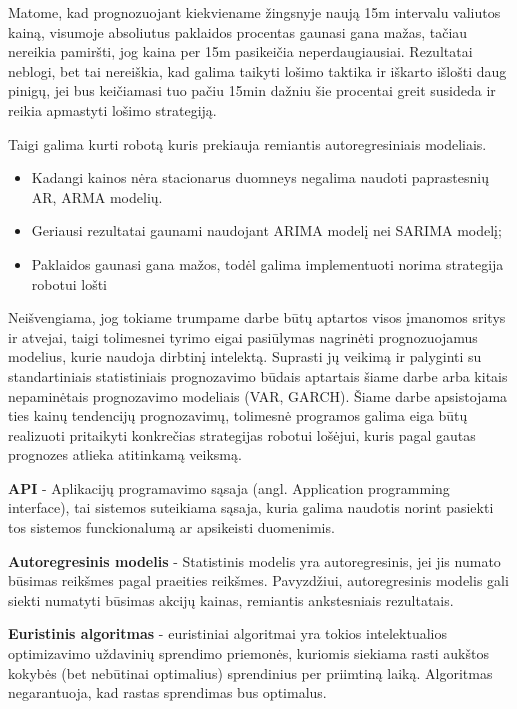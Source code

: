 \documentclass{VUMIFInfKursinis}
\begin{document}
Matome, kad prognozuojant kiekviename žingsnyje naują 15m intervalu valiutos kainą, visumoje absoliutus paklaidos procentas gaunasi gana mažas, tačiau
nereikia pamiršti, jog kaina per 15m pasikeičia neperdaugiausiai. Rezultatai neblogi, bet tai nereiškia, kad galima taikyti lošimo taktika ir iškarto išlošti daug pinigų,
jei bus keičiamasi tuo pačiu 15min dažniu šie procentai greit susideda ir reikia apmastyti lošimo strategiją.

\vspace{10pt}
Taigi galima kurti robotą kuris prekiauja remiantis autoregresiniais modeliais.
\begin{itemize}
  \item Kadangi kainos nėra stacionarus duomneys negalima naudoti paprastesnių AR, ARMA modelių.
  \item Geriausi rezultatai gaunami naudojant ARIMA modelį nei SARIMA modelį;
  \item Paklaidos gaunasi gana mažos, todėl galima implementuoti norima strategija robotui lošti
\end{itemize}
Neišvengiama, jog tokiame trumpame darbe būtų aptartos visos įmanomos sritys ir atvejai, taigi tolimesnei tyrimo eigai pasiūlymas nagrinėti prognozuojamus modelius, 
kurie naudoja dirbtinį intelektą. Suprasti jų veikimą ir palyginti su standartiniais statistiniais prognozavimo būdais aptartais šiame darbe arba kitais nepaminėtais
prognozavimo modeliais (VAR, GARCH). Šiame darbe apsistojama ties kainų tendencijų prognozavimų, tolimesnė programos galima eiga būtų realizuoti pritaikyti konkrečias strategijas 
robotui lošėjui, kuris pagal gautas prognozes atlieka atitinkamą veiksmą.

\textbf{API} - Aplikacijų programavimo sąsaja (angl. Application programming interface), tai sistemos suteikiama sąsaja, kuria galima naudotis norint pasiekti tos sistemos
funckionalumą ar apsikeisti duomenimis.

\textbf{Autoregresinis modelis} - Statistinis modelis yra autoregresinis, jei jis numato būsimas reikšmes pagal praeities reikšmes. Pavyzdžiui, autoregresinis modelis gali
siekti numatyti būsimas akcijų kainas, remiantis ankstesniais rezultatais.

\textbf{Euristinis algoritmas} - euristiniai algoritmai yra tokios intelektualios optimizavimo uždavinių sprendimo priemonės, kuriomis siekiama rasti aukštos
kokybės (bet nebūtinai optimalius) sprendinius per priimtiną laiką. Algoritmas negarantuoja, kad rastas sprendimas bus optimalus. \cite{misevivcius2009euristiniku}
\end{document}
